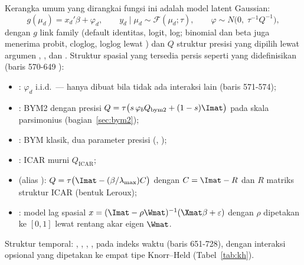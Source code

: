 Kerangka umum yang dirangkai fungsi ini adalah model latent Gaussian:
\begin{equation}
  g(\mu_d)=x_d'\beta+\varphi_d,\qquad
  y_d\mid\mu_d\sim\mathcal F(\mu_d;\tau),\qquad
  \varphi\sim N\bigl(0,\;\tau^{-1}Q^{-1}\bigr),
  \label{eq:hbarea-model}
\end{equation}
dengan $g$ link family (default identitas, logit, log; binomial dan beta juga
menerima probit, cloglog, loglog lewat ) dan $Q$ struktur
presisi yang dipilih lewat argumen , , dan
. Struktur spasial yang tersedia persis seperti yang
didefinisikan  (baris 570-649 ):
\begin{itemize}
  \item {}: $\varphi_d$ i.i.d.\ --- hanya dibuat bila tidak ada
        interaksi lain (baris 571-574);
  \item {}: BYM2 dengan presisi $Q=\tau\bigl(s\,\varphi_b Q_{\text{bym2}}+
        (1-s)\Imat\bigr)$ pada skala parsimonius (bagian~\ref{sec:bym2});
  \item {}: BYM klasik, dua parameter presisi
        (, );
  \item {}: ICAR murni $Q_{\text{ICAR}}$;
  \item {} (alias ): $Q=\tau\bigl(\Imat-(\beta/\lambda_{\max})C\bigr)$
        dengan $C=\Imat-R$ dan $R$ matriks struktur ICAR (bentuk Leroux);
  \item {}: model lag spasial $x=(\Imat-\rho\Wmat)^{-1}
        (\Xmat\beta+\varepsilon)$ dengan $\rho$ dipetakan ke $[0,1]$ lewat
        rentang akar eigen $\Wmat$.
\end{itemize}
Struktur temporal: , , , ,
 pada indeks waktu  (baris 651-728), dengan
interaksi opsional yang dipetakan ke empat tipe Knorr--Held
(Tabel~\ref{tab:kh}).

